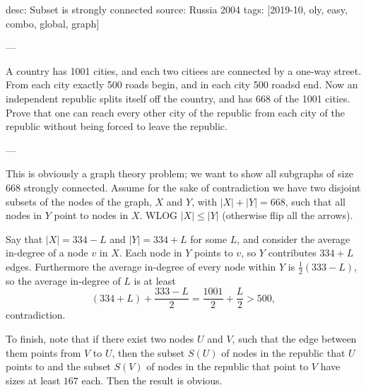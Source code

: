 desc: Subset is strongly connected
source: Russia 2004
tags: [2019-10, oly, easy, combo, global, graph]

---

A country has 1001 cities, and each two citiees are connected by a one-way street. From each city exactly 500 roads begin, and in each city 500 roadsd end. Now an independent republic splits itself off the country, and has 668 of the 1001 cities. Prove that one can reach every other city of the republic from each city of the republic without being forced to leave the republic.

---

This is obviously a graph theory problem; we want to show all subgraphs of size $668$ strongly connected. Assume for the sake of contradiction we have two disjoint subsets of the nodes of the graph, $X$ and $Y$, with $|X|+|Y|=668$, such that all nodes in $Y$ point to nodes in $X$. WLOG $|X|\le|Y|$ (otherwise flip all the arrows).

Say that $|X|=334-L$ and $|Y|=334+L$ for some $L$, and consider the average in-degree of a node $v$ in $X$. Each node in $Y$ points to $v$, so $Y$ contributes $334+L$ edges. Furthermore the average in-degree of every node within $Y$ is $\tfrac12(333-L)$, so the average in-degree of $L$ is at least \[(334+L)+\frac{333-L}2=\frac{1001}2+\frac L2>500,\]
contradiction.

To finish, note that if there exist two nodes $U$ and $V$, such that the edge between them points from $V$ to $U$, then the subset $S(U)$ of nodes in the republic that $U$ points to and the subset $S(V)$ of nodes in the republic that point to $V$ have sizes at least $167$ each. Then the result is obvious.
